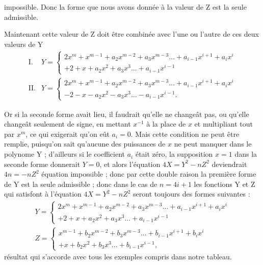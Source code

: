 \documentclass[11pt,a4paper]{article}
\begin{document}

impossible. Donc la forme que nous avons donnée à la valeur de Z est la
seule admissible.

Maintenant cette valeur de Z doit être combinée avec l'une ou l'autre de
ces deux valeurs de Y
\[
\begin{array}{ll}
\text{I.} & Y = \left\{ \begin{array}{l}
2x^m + x^{m-1} + a_2 x^{m-2} + a_3 x^{m-3} \ldots + a_{i-1} x^{i+1} + a_i x^i \\
+ 2 + x + a_2 x^2 + a_3 x^3 \ldots + a_{i-1} x^{i-1}
\end{array} \right. \\[1ex]
\text{II.} & Y = \left\{ \begin{array}{l}
2x^m + x^{m-1} + a_2 x^{m-2} + a_3 x^{m-3} \ldots + a_{i-1} x^{i+1} + a_i x^i \\
- 2 - x - a_2 x^2 - a_3 x^3 \ldots - a_{i-1} x^{i-1}.
\end{array} \right.
\end{array}
\]

Or si la seconde forme avait lieu, il faudrait qu'elle ne changeât pas, ou
qu'elle changeât seulement de signe, en mettant $x^{-1}$ à la place de $x$
et multipliant tout par $x^m$, ce qui exigerait qu'on eût $a_i = 0$. Mais
cette condition ne peut être remplie, puisqu'on sait qu'aucune des
puissances de $x$ ne peut manquer dans le polynome Y ; d'ailleurs si le
coefficient $a_i$ était zéro, la supposition $x = 1$ dans la seconde forme
donnerait $Y = 0$, et alors l'équation $4X = Y^2 - nZ^2$ deviendrait
$4n = -nZ^2$ équation impossible ; donc par cette double raison la première
forme de Y est la seule admissible ; donc dans le cas de $n = 4i + 1$ les
fonctions Y et Z qui satisfont à l'équation $4X = Y^2 - nZ^2$ seront
toujours des formes suivantes :
\[
\begin{array}{l}
Y = \left\{ \begin{array}{l}
2x^m + x^{m-1} + a_2 x^{m-2} + a_3 x^{m-3} \ldots + a_{i-1} x^{i+1} + a_i x^i \\
+ 2 + x + a_2 x^2 + a_3 x^3 \ldots + a_{i-1} x^{i-1}
\end{array} \right. \\[1ex]
Z = \left\{ \begin{array}{l}
x^{m-1} + b_2 x^{m-2} + b_3 x^{m-3} \ldots + b_{i-1} x^{i+1} + b_i x^i \\
+ x + b_2 x^2 + b_3 x^3 \ldots + b_{i-1} x^{i-1},
\end{array} \right.
\end{array}
\]
résultat qui s'accorde avec tous les exemples compris dans notre tableau.
\end{document}
